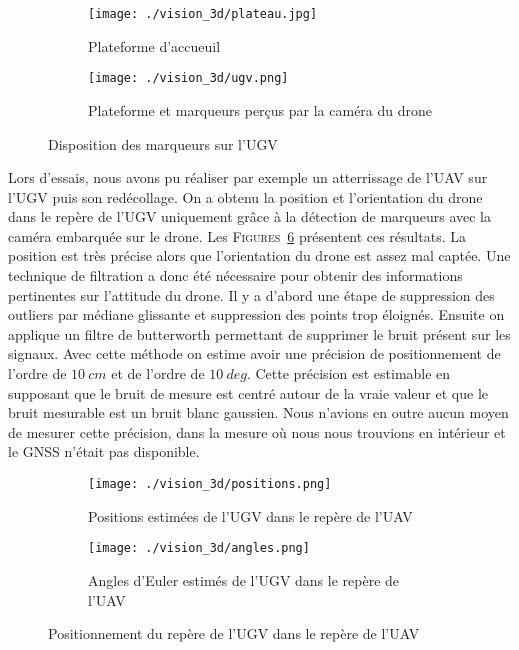     \begin{figure}[!htb]
        \centering
        \begin{subfigure}[b]{0.35\textwidth}
            \centering
            \texttt{[image: ./vision\_3d/plateau.jpg]}
            \caption{Plateforme d'accueuil}
            \label{fig:plateforme}
        \end{subfigure}
        \hfill
        \begin{subfigure}[b]{0.55\textwidth}
            \centering
            \texttt{[image: ./vision\_3d/ugv.png]}
            \caption{Plateforme et marqueurs perçus par la caméra du drone}
            \label{fig:ugv}
        \end{subfigure}
        \caption{Disposition des marqueurs sur l'UGV}
        \label{fig:marqueurs_ugv}
    \end{figure}

    Lors d’essais, nous avons pu réaliser par exemple un atterrissage de l’UAV sur l’UGV puis son redécollage. On a obtenu la position et l’orientation du drone dans le repère de l’UGV uniquement grâce à la détection de marqueurs avec la caméra embarquée sur le drone. Les \textsc{Figures}~\ref{fig:results} présentent ces résultats. La position est très précise alors que l’orientation du drone est assez mal captée. Une technique de filtration a donc été nécessaire pour obtenir des informations pertinentes sur l’attitude du drone. Il y a d’abord une étape de suppression des outliers par médiane glissante et suppression des points trop éloignés. Ensuite on applique un filtre de butterworth permettant de supprimer le bruit présent sur les signaux. Avec cette méthode on estime avoir une précision de positionnement de l'ordre de $10\ cm$ et de l'ordre de $10\ deg$. Cette précision est estimable en supposant que le bruit de mesure est centré autour de la vraie valeur et que le bruit mesurable est un bruit blanc gaussien. Nous n'avions en outre aucun moyen de mesurer cette précision, dans la mesure où nous nous trouvions en intérieur et le GNSS n'était pas disponible.

    \begin{figure}[!htb]
        \centering
        \begin{subfigure}[b]{0.45\textwidth}
            \centering
            \texttt{[image: ./vision\_3d/positions.png]}
            \caption{Positions estimées de l'UGV dans le repère de l'UAV}
            \label{fig:position}
        \end{subfigure}
        \hfill
        \begin{subfigure}[b]{0.45\textwidth}
            \centering
            \texttt{[image: ./vision\_3d/angles.png]}
            \caption{Angles d'Euler estimés de l'UGV dans le repère de l'UAV}
            \label{fig:angle}
        \end{subfigure}
        \caption{Positionnement du repère de l'UGV dans le repère de l'UAV}
        \label{fig:results}
    \end{figure}
